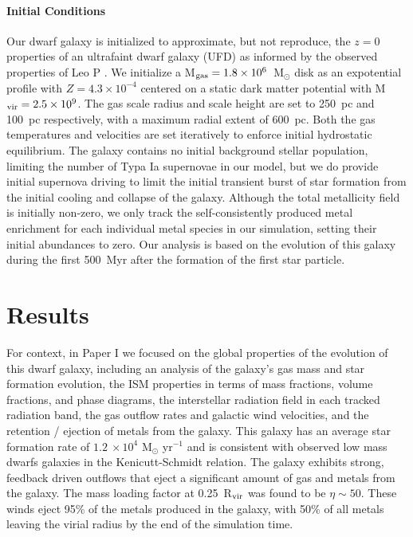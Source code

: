 \documentclass[twocolumn]{aastex61}
\begin{document}
\paragraph{Initial Conditions} Our dwarf galaxy is initialized to approximate, but not reproduce, the $z = 0$ properties of an ultrafaint dwarf galaxy (UFD) as informed by the observed properties of Leo P \citep[see ][]{Giovanelli2013,McQuinn2015a,McQuinn2015}. We initialize a M$_{\rm gas} = 1.8 \times 10^{6}$~M$_{\odot}$ disk as an expotential profile with $Z = 4.3 \times 10^{-4}$ centered on a static \cite{Burkert1995} dark matter potential with M$_{\rm vir} = 2.5 \times 10^{9}$. The gas scale radius and scale height are set to 250~pc and 100~pc respectively, with a maximum radial extent of 600~pc. Both the gas temperatures and velocities are set iteratively to enforce initial hydrostatic equilibrium. The galaxy contains no initial background stellar population, limiting the number of Typa Ia supernovae in our model, but we do provide initial supernova driving to limit the initial transient burst of star formation from the initial cooling and collapse of the galaxy. Although the total metallicity field is initially non-zero, we only track the self-consistently produced metal enrichment for each individual metal species in our simulation, setting their initial abundances to zero. Our analysis is based on the evolution of this galaxy during the first 500~Myr after the formation of the first star particle.

\section{Results}
For context, in Paper I we focused on the global properties of the evolution of this dwarf galaxy, including an analysis of the galaxy's gas mass and star formation evolution, the ISM properties in terms of mass fractions, volume fractions, and phase diagrams, the interstellar radiation field in each tracked radiation band, the gas outflow rates and galactic wind velocities, and the retention / ejection of metals from the galaxy. This galaxy has an average star formation rate of $1.2~\times 10^{4}$ M$_{\odot}$ yr$^{-1}$ and is consistent with observed low mass dwarfs galaxies in the Kenicutt-Schmidt relation.  The galaxy exhibits strong, feedback driven outflows that eject a significant amount of gas and metals from the galaxy. The mass loading factor at 0.25~R$_{\rm vir}$ was found to be $\eta \sim 50$. These winds eject 95\% of the metals produced in the galaxy, with 50\% of all metals leaving the virial radius by the end of the simulation time.
\end{document}
